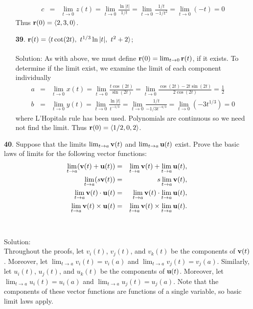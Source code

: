 \documentclass[12pt]{amsbook}
\newcommand{\la}{\langle}
\newcommand{\ra}{\rangle}
\begin{document}
\begin{enumerate}
\begin{eqnarray*}
  c&=&\lim_{t\rightarrow 0}z(t)=\lim_{t \rightarrow 0}\frac{\ln|t|}{1/t}=\lim_{t \rightarrow 0}\frac{1/t}{-1/t^2}=\lim_{t \rightarrow 0}(-t)=0
  \end{eqnarray*}
  Thus ${\bf r}(0)=\la 2,3,0 \ra$. 
  \\
  \item[{\small\bf 39}.] ${\bf r}(t)=\la t\cot(2t), \ t^{1/3}\ln|t|, \ t^2+2\ra$; 
  \\
  \\
  {\sc Solution}: As with above, we must define ${\bf r}(0)=\lim_{t \rightarrow 0}{\bf r}(t)$, if it exists. To determine if the limit exist, we examine the limit of each component individually
  \begin{eqnarray*}
  a&=&\lim_{t \rightarrow 0}x(t)=\lim_{t \rightarrow 0}\frac{t\cos(2t)}{\sin(2t)}=\lim_{t \rightarrow 0}\frac{\cos(2t)-2t\sin(2t)}{2\cos(2t)}=\frac{1}{2}\\
  b&=&\lim_{t \rightarrow 0}y(t)=\lim_{t \rightarrow 0}\frac{\ln|t|}{t^{-1/3}}=\lim_{t \rightarrow 0}\frac{1/t}{-1/3t^{-4/3}}=\lim_{t \rightarrow 0}(-3t^{1/3})=0
  \end{eqnarray*}
  where L'Hopitals rule has been used. Polynomials are continuous so we need not find the limit. Thus ${\bf r}(0)=\la 1/2,0,2 \ra$. 
\end{enumerate}
{\small\bf 40}. Suppose that the limits $\lim_{t\rightarrow a}{\bf v}(t)$ and $\lim_{t\rightarrow a}{\bf u}(t)$ exist. Prove the basic laws of limits for the following vector functions:
\begin{eqnarray}
\lim_{t\rightarrow a}({\bf v}(t)+{\bf u}(t))&=&\lim_{t\rightarrow a}{\bf v}(t)+\lim_{t\rightarrow a}{\bf u}(t),\\
\lim_{t\rightarrow a}(s{\bf v}(t))&=&s\lim_{t\rightarrow a}{\bf v}(t),\\
\lim_{t\rightarrow a}{\bf v}(t)\cdot{\bf u}(t)&=&\lim_{t\rightarrow a}{\bf v}(t)\cdot\lim_{t\rightarrow a}{\bf u}(t),\\
\lim_{t\rightarrow a}{\bf v}(t)\times{\bf u}(t)&=&\lim_{t\rightarrow a}{\bf v}(t)\times\lim_{t\rightarrow a}{\bf u}(t).
\end{eqnarray}
\\
\\
{\sc Solution}: 
\\
Throughout the proofs, let $v_i(t)$, $v_j(t)$, and $v_k(t)$ be the components of ${\bf v}(t)$. Moreover, let $\lim_{t\rightarrow a}v_i(t)=v_i(a)$ and $\lim_{t\rightarrow a}v_j(t)=v_j(a)$. Similarly, let $u_i(t)$, $u_j(t)$, and $u_k(t)$ be the components of ${\bf u}(t)$. Moreover, let $\lim_{t\rightarrow a}u_i(t)=u_i(a)$ and $\lim_{t\rightarrow a}u_j(t)=u_j(a)$. Note that the components of these vector functions are functions of a single variable, so basic limit laws apply.
\end{document}
